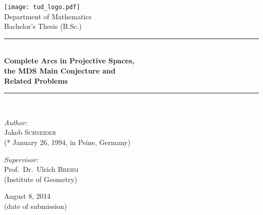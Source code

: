 \pagestyle{empty}
\begin{titlepage}
\begin{center}

    \texttt{[image: tud\_logo.pdf]}\\
    \vspace{1cm}
    {\LARGE\sc Department of Mathematics\\
        \vspace{0.3cm}
        Bachelor's Thesis (B.Sc.)}\\
    \vspace{0.5cm}
\vspace{2cm}
\newcommand{\HRule}{\rule{\linewidth}{0.5mm}}
\HRule\\
{\huge\bfseries Complete Arcs in Projective Spaces,\\[0.1cm]
    the MDS Main Conjecture and\\[0.3cm]
    Related Problems}
\HRule\\[2cm]

\begin{minipage}{0.4\textwidth}
\begin{flushleft} \large
\emph{Author:}\\
Jakob \textsc{Schneider}\\
{\small (* January 26, 1994, in Peine, Germany)}
\end{flushleft}
\end{minipage}
\hfill
\begin{minipage}{0.4\textwidth}
\begin{flushright} \large
\emph{Supervisor:} \\
Prof.~Dr.~Ulrich \textsc{Brehm}\\
{\small (Institute of Geometry)} 
\end{flushright}
\end{minipage}

\vfill

{\large August 8, 2014}\\
{\small (date of submission)}

\end{center}

\end{titlepage}
\cleardoublepage